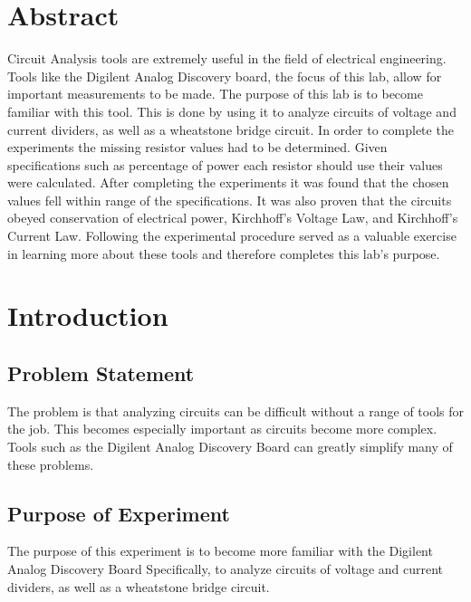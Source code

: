 \section{Abstract}
\label{sec:Abstract}
Circuit Analysis tools are extremely useful in the field of electrical engineering.
Tools like the Digilent Analog Discovery board, the focus of this lab, allow for important
measurements to be made. The purpose of this lab is to become familiar with this tool. This
is done by using it to analyze circuits of voltage and current dividers, as well as a
wheatstone bridge circuit. In order to complete the experiments the missing resistor
values had to be determined. Given specifications such as percentage of power each resistor
should use their values were calculated. After completing the experiments it was found that
the chosen values fell within range of the specifications. It was also proven that
the circuits obeyed conservation of electrical power, Kirchhoff's Voltage Law, and
Kirchhoff's Current Law. Following the experimental procedure served as a valuable
exercise in learning more about these tools and therefore completes this lab's purpose.


\section{Introduction}
\label{sec:Introduction}

\subsection{Problem Statement}
\label{sub:Problem Statement}
The problem is that analyzing circuits can be difficult without a range of tools for the job.
This becomes especially important as circuits become more complex. Tools such as the
Digilent Analog Discovery Board can greatly simplify many of these problems.

\subsection{Purpose of Experiment}
\label{sub:Purpose of Experiment}
The purpose of this experiment is to become more familiar with the Digilent Analog Discovery Board
Specifically, to analyze circuits of voltage and current dividers, as well as a
wheatstone bridge circuit.

